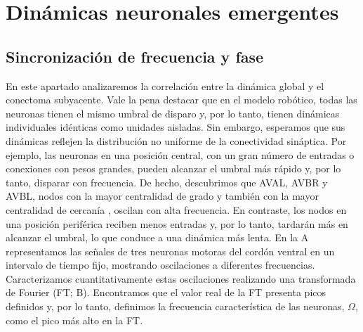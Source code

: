 \section{Dinámicas neuronales emergentes}

 \subsection{ Sincronización de frecuencia y fase}

En este apartado analizaremos la correlación entre la dinámica global y el conectoma subyacente. Vale la pena destacar que en el modelo robótico, todas las neuronas tienen el mismo umbral de disparo y, por lo tanto, tienen dinámicas individuales idénticas como unidades aisladas. Sin embargo, esperamos que sus dinámicas reflejen la distribución no uniforme de la conectividad sináptica. Por ejemplo, las neuronas en una posición central, con un gran número de entradas o conexiones con pesos grandes, pueden alcanzar el umbral más rápido y, por lo tanto, disparar con frecuencia. De hecho, descubrimos que AVAL, AVBR y AVBL, nodos con la mayor centralidad de grado y también con la mayor centralidad de cercanía \cite{varshney_structural_2011}, oscilan con alta frecuencia. En contraste, los nodos en una posición periférica reciben menos entradas y, por lo tanto, tardarán más en alcanzar el umbral, lo que conduce a una dinámica más lenta. En la A representamos las señales de tres neuronas motoras del cordón ventral en un intervalo de tiempo fijo, mostrando oscilaciones a diferentes frecuencias. Caracterizamos cuantitativamente estas oscilaciones realizando una transformada de Fourier (FT; B). Encontramos que el valor real de la FT presenta picos definidos y, por lo tanto, definimos la frecuencia característica de las neuronas, $\Omega$, como el pico más alto en la FT.


